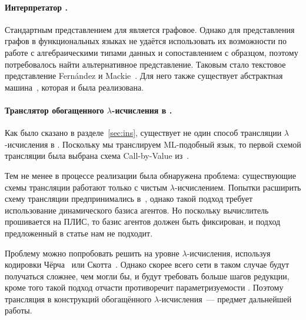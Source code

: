 \paragraph{Интерпретатор \INs{}.}

Стандартным представлением для \INs{} является графовое.
Однако для представления графов в функциональных языках не удаётся использовать их возможности по работе с алгебраическими типами данных и сопоставлением с образцом, поэтому потребовалось найти альтернативное представление.
Таковым стало текстовое представление Fernández и Mackie~\cite{fernandezCalculusInteractionNets1999}.
Для него также существует абстрактная машина~\cite{pintoSequentialConcurrentAbstract2000}, которая и была реализована.

\paragraph{Транслятор обогащенного $\lambda$-исчисления в \INs{}.}

Как было сказано в разделе~\ref{sec:ins}, существует не один способ трансляции $\lambda$-исчисления в \INs{}.
Поскольку мы транслируем ML-подобный язык, то первой схемой трансляции была выбрана схема Call-by-Value из~\cite{sinotCallbyNameCallbyValueTokenPassing2005}.

Тем не менее в процессе реализации была обнаружена проблема: существующие схемы трансляции работают только с чистым $\lambda$-исчислением.
Попытки расширить схему трансляции предпринимались в~\cite{jireschExtendingInteractionNets2012}, однако такой подход требует использование динамического базиса агентов.
Но поскольку вычислитель прошивается на ПЛИС, то базис агентов должен быть фиксирован, и подход предложенный в статье нам не подходит.

Проблему можно попробовать решить на уровне $\lambda$-исчисления, используя кодировки Чёрча~\cite{barendregtImpactLambdaCalculus1997} или Скотта~\cite{koopmanChurchEncodingData2014}.
Однако скорее всего сети в таком случае будут получаться сложнее, чем могли бы, и будут требовать больше шагов редукции, кроме того такой подход отчасти противоречит параметризуемости \INs{}.
Поэтому трансляция в \INs{} конструкций обогащённого $\lambda$-исчисления~--- предмет дальнейшей работы.
